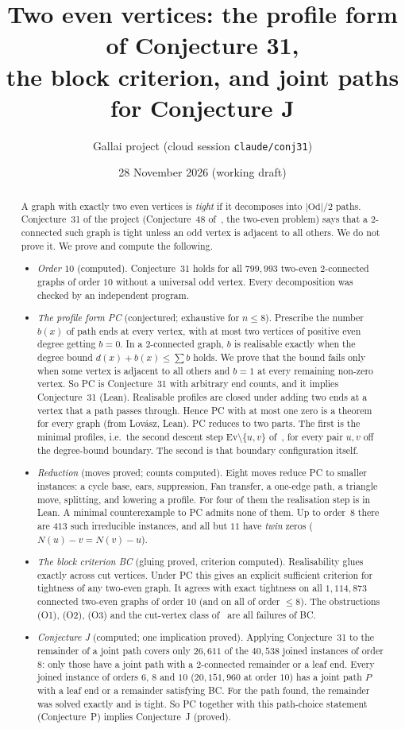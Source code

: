 \documentclass[11pt]{amsart}
\title[Conjecture 31]{Two even vertices: the profile form of Conjecture 31,\\
the block criterion, and joint paths for Conjecture J}
\author{Gallai project (cloud session \texttt{claude/conj31})}
\date{28 November 2026 (working draft)}
\theoremstyle{definition}
\newcommand{\Od}{\mathrm{Od}}
\begin{document}
\begin{abstract}
A graph with exactly two even vertices is \emph{tight} if it decomposes into $|\Od|/2$ paths.
Conjecture~31 of the project (Conjecture~48 of~\cite{EP}, the two-even problem) says that a $2$-connected
such graph is tight unless an odd vertex is adjacent to all others. We do not prove it. We prove and compute the following.
\begin{itemize}
\item \emph{Order $10$} (computed). Conjecture~31 holds for all $799{,}993$ two-even $2$-connected graphs of
order $10$ without a universal odd vertex. Every decomposition was checked by an independent program.
\item \emph{The profile form PC} (conjectured; exhaustive for $n\le 8$). Prescribe the number $b(x)$ of path
ends at every vertex, with at most two vertices of positive even degree getting $b=0$. In a
$2$-connected graph, $b$ is realisable exactly when the degree bound $d(x)+b(x)\le\sum b$ holds.
We prove that the bound fails only when some vertex is adjacent to all others and $b=1$ at every
remaining non-zero vertex. So PC is Conjecture~31 with arbitrary end counts, and it implies Conjecture~31 (Lean).
Realisable profiles are closed under adding two ends at a vertex that a path passes through. Hence
PC with at most one zero is a theorem for every graph (from Lov\'asz, Lean). PC reduces to two parts.
The first is the minimal profiles, i.e.\ the second descent step $\mathrm{Ev}\setminus\{u,v\}$
of~\cite{EP}, for every pair $u,v$ off the degree-bound boundary. The second is that boundary
configuration itself.
\item \emph{Reduction} (moves proved; counts computed). Eight moves reduce PC to smaller instances: a cycle
base, ears, suppression, Fan transfer, a one-edge path, a triangle move, splitting, and lowering a
profile. For four of them the realisation step is in Lean. A minimal counterexample to PC admits none of
them. Up to order~$8$ there are $413$ such irreducible instances, and all but $11$ have \emph{twin} zeros
($N(u)-v=N(v)-u$).
\item \emph{The block criterion BC} (gluing proved, criterion computed). Realisability glues exactly across
cut vertices. Under PC this gives an explicit sufficient criterion for tightness of any two-even graph.
It agrees with exact tightness on all $1{,}114{,}873$ connected two-even graphs of order $10$ (and on all of
order $\le 8$). The obstructions (O1), (O2), (O3) and the cut-vertex class of~\cite{EP} are all failures of BC.
\item \emph{Conjecture J} (computed; one implication proved). Applying Conjecture~31 to the remainder of a
joint path covers only $26{,}611$ of the $40{,}538$ joined instances of order $8$: only those have a joint path
with a $2$-connected remainder or a leaf end. Every joined instance of orders $6$, $8$ and $10$
($20{,}151{,}960$ at order $10$) has a joint path $P$ with a leaf end or a remainder satisfying BC. For the path
found, the remainder was solved exactly and is tight. So PC together with this path-choice statement
(Conjecture~P) implies Conjecture~J (proved).
\end{itemize}
\end{abstract}
\end{document}
